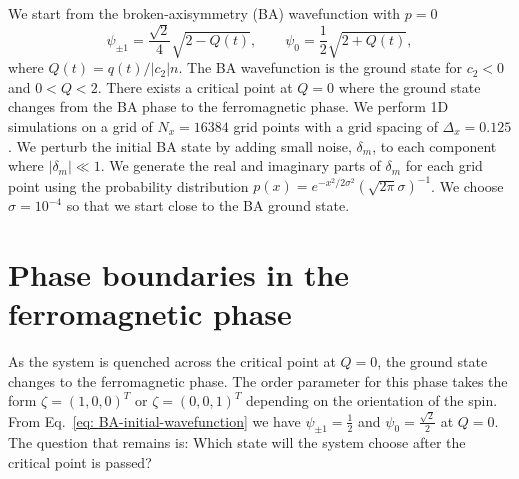 We start from the broken-axisymmetry (BA) wavefunction with $p=0$
\begin{equation}
    \psi_{\pm 1} = \frac{\sqrt{2}}{4}\sqrt{2 - Q(t)}, \qquad
    \psi_0 = \frac{1}{2}\sqrt{2 + Q(t)},
    \label{eq: BA-initial-wavefunction}
\end{equation}
where $Q(t)=q(t)/|c_2|n$.
The BA wavefunction is the ground state for $c_2 < 0$ and $0 < Q < 2$.
There exists a critical point at $Q=0$ where the ground state changes from
the BA phase to the ferromagnetic phase.
We perform 1D simulations on a grid of $N_x = 16384$ grid points with a grid
spacing of $\Delta_x = 0.125$.
We perturb the initial BA state by adding small noise, $\delta_m$, to each
component where $|\delta_m| \ll 1$.
We generate the real and imaginary parts of $\delta_m$ for each grid point
using the probability distribution
$p(x) = e^{-x^2/2\sigma^2}(\sqrt{2\pi}\sigma)^{-1}$.
We choose $\sigma=10^{-4}$ so that we start close to the BA ground state.

\section{Phase boundaries in the ferromagnetic phase}
As the system is quenched across the critical point at $Q=0$, the ground state
changes to the ferromagnetic phase.
The order parameter for this phase takes the form $\zeta=(1,0,0)^T$ or 
$\zeta=(0,0,1)^T$ depending on the orientation of the spin.
From Eq.~\eqref{eq: BA-initial-wavefunction} we have
$\psi_{\pm 1} = \frac{1}{2}$ and $\psi_0 = \frac{\sqrt{2}}{2}$ at $Q=0$.
The question that remains is: Which state will the system choose after
the critical point is passed?

